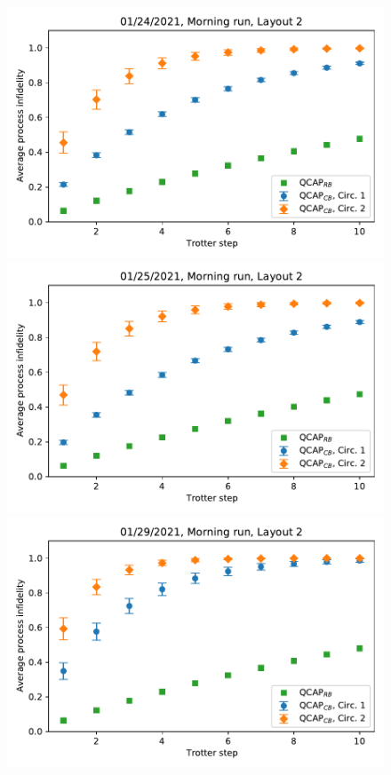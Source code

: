 \begin{figure}[ht!]
    \includegraphics[scale=0.36]{QCAP_CB_RB_Data_01_24_2021_Layout_2C1_C2_Morning.pdf}
    \includegraphics[scale=0.36]{QCAP_CB_RB_Data_01_25_2021_Layout_2C1_C2_Morning.pdf}
    \includegraphics[scale=0.36]{QCAP_CB_RB_Data_01_29_2021_Layout_2C1_C2_Morning.pdf}

\end{figure}
